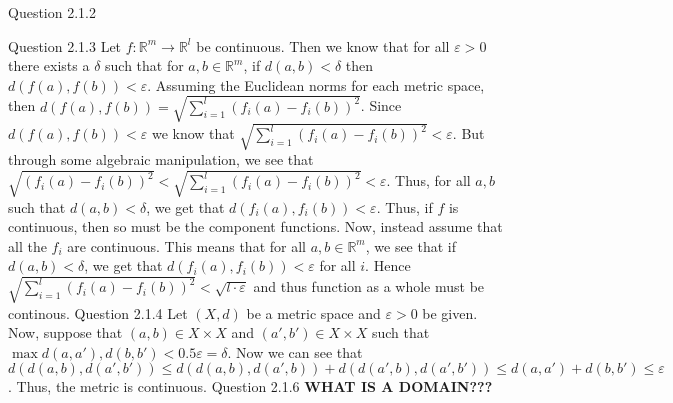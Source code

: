 \documentclass[12pt]{exam}
\begin{document}
\begin{questions}
\question Question 2.1.2
\question Question 2.1.3\newline
Let $f: \mathbb{R}^m \rightarrow \mathbb{R}^l$ be continuous. Then we know that for all $\varepsilon >0$ there exists a $\delta$ such that for $a,b \in \mathbb{R}^m$, if $d(a,b) < \delta$ then $d(f(a), f(b)) < \varepsilon$. Assuming the Euclidean norms for each metric space, then $d(f(a), f(b)) = \sqrt{\sum_{i = 1}^{l} (f_i(a) - f_i(b))^2}$. Since $d(f(a), f(b)) < \varepsilon$ we know that $\sqrt{\sum_{i = 1}^{l} (f_i(a) - f_i(b))^2} < \varepsilon$. But through some algebraic manipulation, we see that $\sqrt{(f_i(a)-f_i(b))^2} < \sqrt{\sum_{i = 1}^{l} (f_i(a) - f_i(b))^2} < \varepsilon$. Thus, for all $a,b$ such that $d(a,b)< \delta$, we get that $d(f_i(a), f_i(b)) < \varepsilon$. Thus, if $f$ is continuous, then so must be the component functions. Now, instead assume that all the $f_i$ are continuous. This means that for all $a,b \in \mathbb{R}^m$, we see that if $d(a,b) < \delta$, we get that $d(f_i(a), f_i(b)) < \varepsilon$ for all $i$. Hence $\sqrt{\sum_{i = 1}^{l} (f_i(a) - f_i(b))^2} < \sqrt{l \cdot \varepsilon}$ and thus function as a whole must be continous. 
\question Question 2.1.4\newline
Let $(X, d)$ be a metric space and $\varepsilon > 0$ be given. Now, suppose that $(a,b) \in X \times X$ and $(a', b') \in X \times X$ such that $\max{d(a, a'), d(b, b')} < 0.5\varepsilon = \delta$. Now we can see that $d(d(a,b), d(a',b')) \leq d(d(a,b), d(a',b)) + d(d(a', b), d(a', b')) \leq d(a, a') + d(b, b') \leq \varepsilon$. Thus, the metric is continuous. 
\question Question 2.1.6 \newline
\textbf{WHAT IS A DOMAIN???}

\end{questions}
\end{document}
